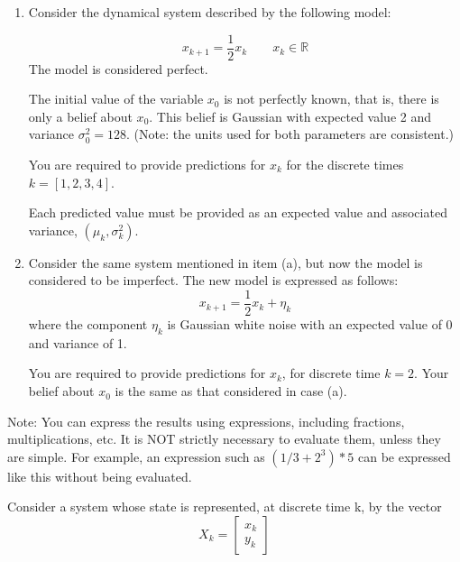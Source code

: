 \documentclass[final]{lcc}
\begin{document}
\begin{enumerate}

    \item Consider the dynamical system described by the following model:

    \begin{equation*}
    x_{k+1} = \frac{1}{2}x_{k} \qquad x_{k} \in \mathbb{R}
    \end{equation*}
    The model is considered perfect.

    The initial value of the variable $x_0$ is not perfectly known, that is, there is only a belief about $x_0$. This belief is Gaussian with expected value 2 and variance $\sigma^2_{0} = 128$. (Note: the units used for both parameters are consistent.)

    You are required to provide predictions for $x_k$ for the discrete times $k=[1,2,3,4]$.

    Each predicted value must be provided as an expected value and associated variance, $\left(\mu_{k}, \sigma_{k}^2\right)$.

    \item Consider the same system mentioned in item (a), but now the model is considered to be imperfect. The new model is expressed as follows:
    \begin{equation*}
    x_{k+1} = \frac{1}{2}x_k + \eta_k
    \end{equation*}
    where the component $\eta_k$ is Gaussian white noise with an expected value of 0 and variance of 1.

    You are required to provide predictions for $x_{k}$, for discrete time $k=2$. Your belief about $x_0$ is the same as that considered in case (a).

\end{enumerate}

Note: You can express the results using expressions, including fractions, multiplications, etc. It is NOT strictly necessary to evaluate them, unless they are simple. For example, an expression such as $(1/3 + 2^3)*5$ can be expressed like this without being evaluated.

\ejercicio Consider a system whose state is represented, at discrete time k, by the vector
    \begin{equation*}
    X_{k} = \begin{bmatrix}
    x_{k}\\
    y_{k}
    \end{bmatrix}
    \end{equation*}
\end{document}
